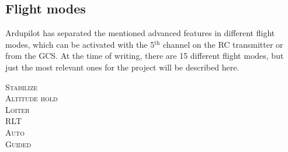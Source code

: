\subsection{Flight modes}

Ardupilot has separated the mentioned advanced features in different flight modes, which can be activated with the 5$^{\text{th}}$ channel on the RC transmitter or from the GCS.
At the time of writing, there are 15 different flight modes, but just the most relevant ones for the project will be described here.

\begin{description}
	\item[\scshape Stabilize]
	\item[\scshape Altitude hold]
	\item[\scshape Loiter]
	\item[\scshape RLT]
	\item[\scshape Auto]
	\item[\scshape Guided]
\end{description}
